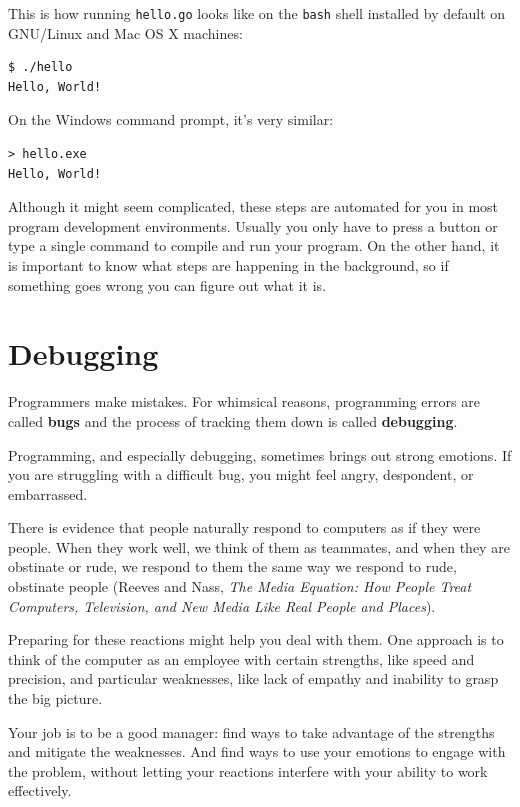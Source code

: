 This is how running {\tt hello.go} looks like on the {\tt bash} shell installed by default on GNU/Linux and Mac OS X machines:

\begin{verbatim}
$ ./hello 
Hello, World!
\end{verbatim}

On the Windows command prompt, it's very similar:

\begin{verbatim}
> hello.exe 
Hello, World!
\end{verbatim}


Although it might seem complicated, these steps are automated for you in most program development environments.
Usually you only have to press a button or type a single command to compile and run your program.
On the other hand, it is important to know what steps are happening in the background,
so if something goes wrong you can figure out what it is.



\section{Debugging}

Programmers make mistakes. For whimsical reasons, programming errors are
called {\bf bugs} and the process of tracking them down is called {\bf
debugging}.

Programming, and especially debugging, sometimes brings out strong emotions.
If you are struggling with a difficult bug, you might  feel angry, despondent,
or embarrassed.

There is evidence that people naturally respond to computers as if they were
people. When they work well, we think of them as teammates, and when they are
obstinate or rude, we respond to them the same way we respond to rude,
obstinate people (Reeves and Nass, {\it The Media  Equation: How People
Treat Computers, Television, and New Media Like Real People and Places}).

Preparing for these reactions might help you deal with them. One approach is
to think of the computer as an employee with certain strengths, like speed and
precision, and particular weaknesses, like lack of empathy and inability to
grasp the big picture.

Your job is to be a good manager: find ways to take advantage of the strengths
and mitigate the weaknesses. And find ways to use your emotions to engage with
the problem, without letting your reactions interfere with your ability to
work effectively.

